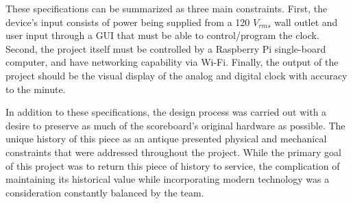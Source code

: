 \documentclass[11pt]{article}
\begin{document}

These specifications can be summarized as three main constraints. First, the device's input consists of power being supplied from a 120 $V_{rms}$ wall outlet and user input through a GUI that must be able to control/program the clock. Second, the project itself must be controlled by a Raspberry Pi single-board computer, and have networking capability via Wi-Fi. Finally, the output of the project should be the visual display of the analog and digital clock with accuracy to the minute. 


In addition to these specifications, the design process was carried out with a desire to preserve as much of the scoreboard's original hardware as possible. 
The unique history of this piece as an antique presented physical and mechanical constraints that were addressed throughout the project. 
While the primary goal of this project was to return this piece of history to service, the complication of maintaining its historical value while incorporating modern technology was a consideration constantly balanced by the team.
\end{document}
